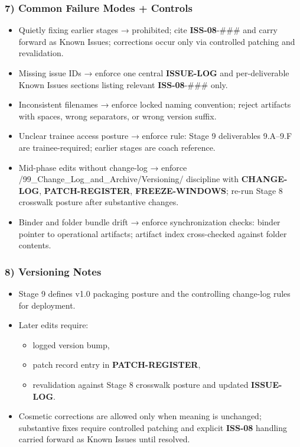\documentclass[10pt]{article}
\begin{document}
\subsubsection*{7) Common Failure Modes + Controls}

\begin{itemize}
\item Quietly fixing earlier stages → prohibited; cite \textbf{ISS-08}-\#\#\# and carry forward as Known Issues; corrections occur only via controlled patching and revalidation.
\item Missing issue IDs → enforce one central \textbf{ISSUE-LOG} and per-deliverable Known Issues sections listing relevant \textbf{ISS-08}-\#\#\# only.
\item Inconsistent filenames → enforce locked naming convention; reject artifacts with spaces, wrong separators, or wrong version suffix.
\item Unclear trainee access posture → enforce rule: Stage 9 deliverables 9.A–9.F are trainee-required; earlier stages are coach reference.
\item Mid-phase edits without change-log → enforce /99\_Change\_Log\_and\_Archive/Versioning/ discipline with \textbf{CHANGE-LOG}, \textbf{PATCH-REGISTER}, \textbf{FREEZE-WINDOWS}; re-run Stage 8 crosswalk posture after substantive changes.
\item Binder and folder bundle drift → enforce synchronization checks: binder pointer to operational artifacts; artifact index cross-checked against folder contents.
\end{itemize}

\subsubsection*{8) Versioning Notes}

\begin{itemize}
\item Stage 9 defines v1.0 packaging posture and the controlling change-log rules for deployment.
\item Later edits require:
  \begin{itemize}
  \item logged version bump,
  \item patch record entry in \textbf{PATCH-REGISTER},
  \item revalidation against Stage 8 crosswalk posture and updated \textbf{ISSUE-LOG}.
  \end{itemize}
\item Cosmetic corrections are allowed only when meaning is unchanged; substantive fixes require controlled patching and explicit \textbf{ISS-08} handling carried forward as Known Issues until resolved.
\end{itemize}
\end{document}
